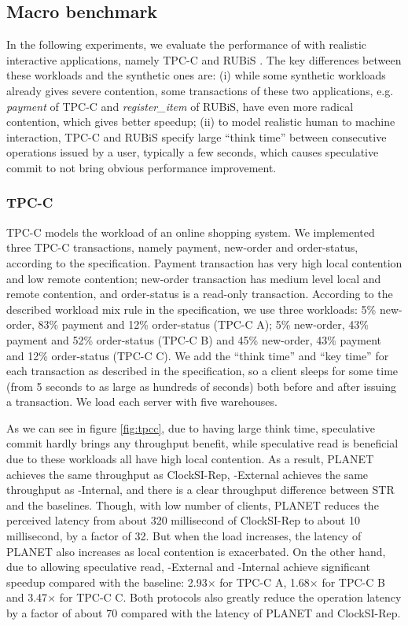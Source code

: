 \subsection{Macro benchmark}
In the following experiments, we evaluate the performance of \specula with realistic interactive applications, namely TPC-C\cite{tpcc} and RUBiS \cite{rubis}. The key differences between these workloads and the synthetic ones are: (i) while some synthetic workloads already gives severe contention, some transactions of these two applications, e.g. \textit{payment} of TPC-C and \textit{register\_item} of RUBiS, have even more radical contention, which gives \specula better speedup; (ii) to model realistic human to machine interaction, TPC-C and RUBiS specify large ``think time'' between consecutive operations issued by a user, typically a few seconds, which causes speculative commit to not bring obvious performance improvement.

\subsubsection{TPC-C}
TPC-C \cite{tpcc} models the workload of an online shopping system. We implemented three TPC-C transactions, namely payment, new-order and order-status, according to the specification. Payment transaction has very high local contention and low remote contention; new-order transaction has medium level local and remote contention, and order-status is a read-only transaction. According to the described workload mix rule in the specification, we use three workloads: 5\% new-order, 83\% payment and 12\% order-status (TPC-C A); 5\% new-order, 43\% payment and 52\% order-status (TPC-C B) and 45\% new-order, 43\% payment and 12\% order-status (TPC-C C). We add the ``think time'' and ``key time'' for each transaction as described in the specification, so a client sleeps for some time (from 5 seconds to as large as hundreds of seconds) both before and after issuing a transaction. We load each server with five warehouses.

As we can see in figure \ref{fig:tpcc}, due to having large think time, speculative commit hardly brings any throughput benefit, while speculative read is beneficial due to these workloads all have high local contention. As a result, PLANET achieves the same throughput as ClockSI-Rep, {\specula}-External achieves the same throughput as {\specula}-Internal, and there is a clear throughput difference between STR and the baselines. Though, with low number of clients, PLANET reduces the perceived latency from about 320 millisecond of ClockSI-Rep to about 10 millisecond, by a factor of 32. But when the load increases, the latency of PLANET also increases as local contention is exacerbated. On the other hand, due to allowing speculative read, {\specula}-External and {\specula-Internal} achieve significant speedup compared with the baseline: 2.93$\times$ for TPC-C A, 1.68$\times$ for TPC-C B and 3.47$\times$ for TPC-C C. Both {\specula} protocols also greatly reduce the operation latency by a factor of about 70 compared with the latency of PLANET and ClockSI-Rep.

